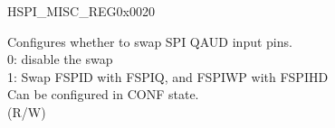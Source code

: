 \addtocounter{Regfloat}{-1}
\begin{register}{H}{SPI\_MISC\_REG}{0x0020}
\begin{regdesc}\begin{reglist}
\item [Continued from the previous page...]

\label{fielddesc:SPIQUADDINPINSWAP}\item [SPI\_QUAD\_DIN\_PIN\_SWAP] Configures whether to swap SPI QAUD input pins.\\
0: disable the swap\\
1: Swap FSPID with FSPIQ, and FSPIWP with FSPIHD\\
Can be configured in CONF state. \\ (R/W)
\end{reglist}\end{regdesc}
\end{register}


